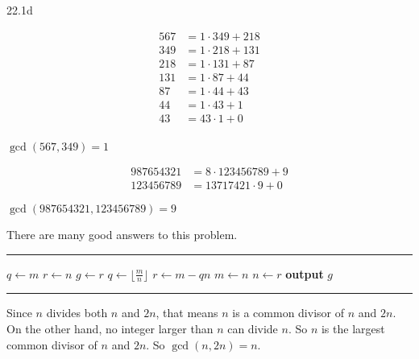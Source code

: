 \begin{Solution}{22.1d}


\begin{align*}
 567 &= 1\cdot349+218 \\
 349 &= 1\cdot218+131 \\
  218 &= 1\cdot131+87 \\
  131 &= 1\cdot87+44 \\
  87  &= 1\cdot44+43 \\
  44  &= 1\cdot43+1 \\
  43 &= 43\cdot1 + 0\\
\end{align*}

$\gcd(567,349) = 1$

\end{Solution}

\begin{Solution}{22.2}

\begin{align*} 
  987654321  &= 8\cdot123456789+9 \\
  123456789  &= 13717421\cdot9+0
\end{align*}

$\gcd(987654321,123456789) = 9$

\end{Solution}

\begin{Solution}{22.3}
There are many good answers to this problem. 
\begin{algrthm}
  \hrule\kern5pt\relax
  \begin{algorithmic}%
     \State $q \gets m$ 
     \State $r \gets n$      
       \State $g \gets r$ 
       \State $q \gets \lfloor \frac{m}{n}\rfloor$ 
       \State $r \gets m - qn$ 
       \State $m \gets n$ 
       \State $n \gets r$   
     \EndWhile
     \State \textbf{output} $g$ 
\end{algorithmic}
  \hrule\kern5pt\relax

\end{algrthm}

\end{Solution}

\begin{Solution}{22.4}
Since $n$ divides both $n$ and $2n$, that means $n$
is a common divisor of $n$ and $2n$. On the other hand, no integer larger
than $n$ can divide $n$. So $n$ is the largest common divisor of $n$ and $2n$.
So $\gcd(n,2n) = n$.
\end{Solution}



